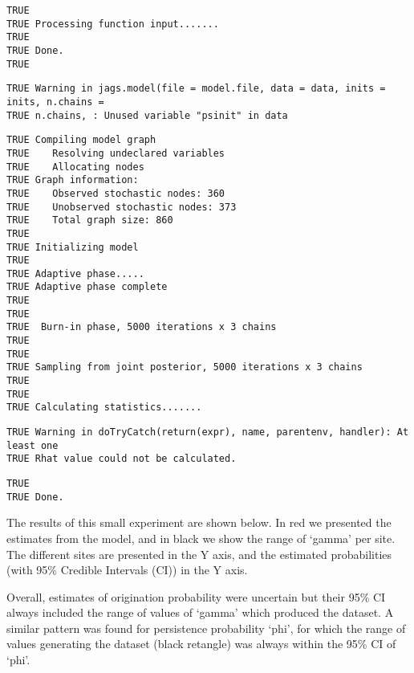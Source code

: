 \documentclass[
]{article}
\begin{document}
\begin{verbatim}
TRUE 
TRUE Processing function input....... 
TRUE 
TRUE Done. 
TRUE 
\end{verbatim}

\begin{verbatim}
TRUE Warning in jags.model(file = model.file, data = data, inits = inits, n.chains =
TRUE n.chains, : Unused variable "psinit" in data
\end{verbatim}

\begin{verbatim}
TRUE Compiling model graph
TRUE    Resolving undeclared variables
TRUE    Allocating nodes
TRUE Graph information:
TRUE    Observed stochastic nodes: 360
TRUE    Unobserved stochastic nodes: 373
TRUE    Total graph size: 860
TRUE 
TRUE Initializing model
TRUE 
TRUE Adaptive phase..... 
TRUE Adaptive phase complete 
TRUE  
TRUE 
TRUE  Burn-in phase, 5000 iterations x 3 chains 
TRUE  
TRUE 
TRUE Sampling from joint posterior, 5000 iterations x 3 chains 
TRUE  
TRUE 
TRUE Calculating statistics.......
\end{verbatim}

\begin{verbatim}
TRUE Warning in doTryCatch(return(expr), name, parentenv, handler): At least one
TRUE Rhat value could not be calculated.
\end{verbatim}

\begin{verbatim}
TRUE 
TRUE Done.
\end{verbatim}

The results of this small experiment are shown below. In red we
presented the estimates from the model, and in black we show the range
of `gamma' per site. The different sites are presented in the Y axis,
and the estimated probabilities (with 95\% Credible Intervals (CI)) in
the Y axis.

Overall, estimates of origination probability were uncertain but their
95\% CI always included the range of values of `gamma' which produced
the dataset. A similar pattern was found for persistence probability
`phi', for which the range of values generating the dataset (black
retangle) was always within the 95\% CI of `phi'.
\end{document}
